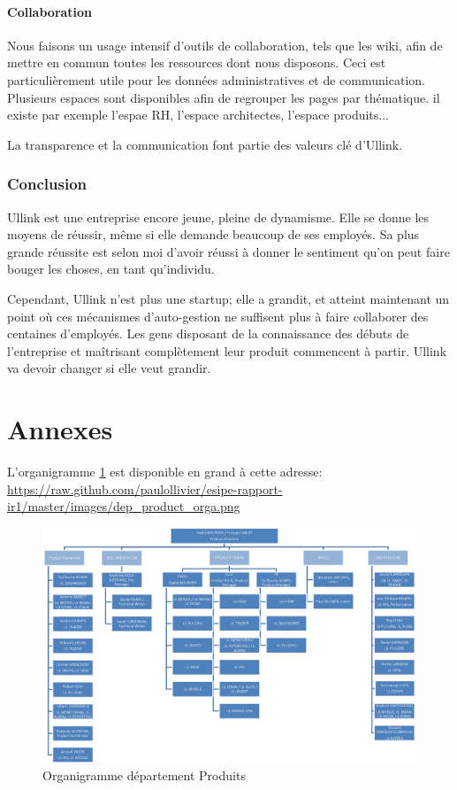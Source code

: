 \documentclass[a4paper, 12pt]{article}
\begin{document}
\subsection{Collaboration}

Nous faisons un usage intensif d'outils de collaboration, tels que les wiki, afin de mettre en commun toutes les ressources dont nous disposons. Ceci est particulièrement utile pour les données administratives et de communication. Plusieurs espaces sont disponibles afin de regrouper les pages par thématique. il existe par exemple l'espae RH, l'espace architectes, l'espace produits...

La transparence et la communication font partie des valeurs clé d'Ullink.

\pagebreak
\section*{Conclusion}

Ullink est une entreprise encore jeune, pleine de dynamisme. Elle se donne les moyens de réussir, même si elle demande beaucoup de ses employés. Sa plus grande réussite est selon moi d'avoir réussi à donner le sentiment qu'on peut faire bouger les choses, en tant qu'individu.

Cependant, Ullink n'est plus une startup; elle a grandit, et atteint maintenant un point où ces mécanismes d'auto-gestion ne suffisent plus à faire collaborer des centaines d'employés. Les gens disposant de la connaissance des débuts de l'entreprise et maîtrisant complètement leur produit commencent à partir. Ullink va devoir changer si elle veut grandir.

\pagebreak

\part*{Annexes}
L'organigramme \ref{Product_dpts_orga} est disponible en grand à cette adresse: \url{https://raw.github.com/paulollivier/esipe-rapport-ir1/master/images/dep_product_orga.png}
\begin{figure}
\includegraphics[width=525pt, angle=90]{dep_product_orga.png}
\caption{Organigramme département Produits}
\label{Product_dpts_orga}
\end{figure}
\end{document}
